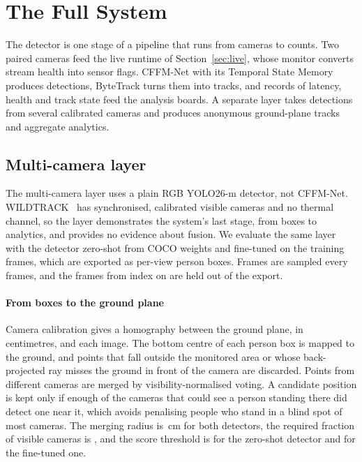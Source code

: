 \section{The Full System}
\label{sec:system}
The detector is one stage of a pipeline that runs from cameras to counts. Two paired cameras feed the live runtime of Section~\ref{sec:live}, whose monitor converts stream health into sensor flags. CFFM-Net with its Temporal State Memory produces detections, ByteTrack turns them into tracks, and records of latency, health and track state feed the analysis boards. A separate layer takes detections from several calibrated cameras and produces anonymous ground-plane tracks and aggregate analytics.

\subsection{Multi-camera layer}
The multi-camera layer uses a plain RGB YOLO26-m detector, not CFFM-Net. WILDTRACK~\cite{chavdarova2018wildtrack} has \cfgCamViews{} synchronised, calibrated visible cameras and no thermal channel, so the layer demonstrates the system's last stage, from boxes to analytics, and provides no evidence about fusion. We evaluate the same layer with the detector zero-shot from COCO weights and fine-tuned on the training frames, which are exported as per-view person boxes. Frames are sampled every \cfgWtStep{} frames, and the frames from index \cfgWtTestFrom{} on are held out of the export.

\paragraph{From boxes to the ground plane}
Camera calibration gives a homography between the ground plane, in centimetres, and each image. The bottom centre of each person box is mapped to the ground, and points that fall outside the monitored area or whose back-projected ray misses the ground in front of the camera are discarded. Points from different cameras are merged by visibility-normalised voting. A candidate position is kept only if enough of the cameras that could see a person standing there did detect one near it, which avoids penalising people who stand in a blind spot of most cameras. The merging radius is \camFusionFineTunedRadius{}\,cm for both detectors, the required fraction of visible cameras is \camFusionFineTunedMinRatio{}, and the score threshold is \camFusionZeroShotMinScore{} for the zero-shot detector and \camFusionFineTunedMinScore{} for the fine-tuned one.

